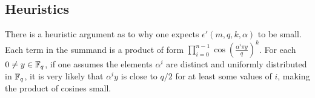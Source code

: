 \documentclass[envcountsect]{llncs}
\begin{document}
\subsection{Heuristics}

There is a heuristic argument as to why one expects $\epsilon'(m,q,k,\alpha)$ to be small. Each term in the summand is a product of form $\prod_{i=0}^{n-1} \cos \left(\frac{ \alpha^i \pi y}{q} \right)^k$. For each $0 \neq y \in \mathbb{F}_q$, if one assumes the elements $\alpha^i$ are distinct and uniformly distributed in $\mathbb{F}_q$, it is very likely that $\alpha^i y$ is close to $q/2$ for at least some values of $i$, making the product of cosines small.



\end{document}
